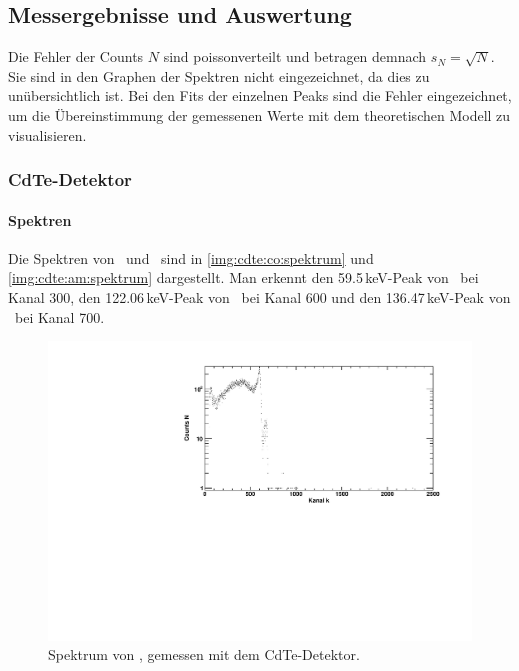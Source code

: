 \subsection{Messergebnisse und Auswertung}
Die Fehler der Counts $N$ sind poissonverteilt und betragen demnach $s_N = \sqrt{N}$. Sie sind in den Graphen der Spektren nicht eingezeichnet, 
da dies zu unübersichtlich ist. Bei den Fits der einzelnen Peaks sind die Fehler eingezeichnet, um die Übereinstimmung der gemessenen Werte 
mit dem theoretischen Modell zu visualisieren.
\subsubsection{CdTe-Detektor}
\paragraph{Spektren}
Die Spektren von \co\ und \am\ sind in \autoref{img:cdte:co:spektrum} und \autoref{img:cdte:am:spektrum} dargestellt. Man erkennt den 59.5\,keV-Peak 
von \am\, bei Kanal 300, den 122.06\,keV-Peak von \co\, bei Kanal 600 und den 136.47\,keV-Peak von \co\, bei Kanal 700.
\begin{figure}[H]
\begin{center}
  \includegraphics[width=\textwidth]{../img/part3/Co-CdTe_spectrum.pdf}
  \caption{Spektrum von \co, gemessen mit dem CdTe-Detektor.}
  \label{img:cdte:co:spektrum}
\end{center}
\end{figure}

